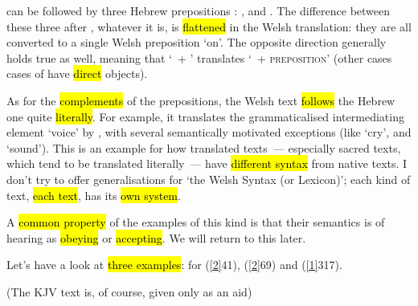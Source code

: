 \begin{paper}
	{\click} {\click} {\shama} can be followed by three Hebrew prepositions : ,  and . The difference between these three after \shama, whatever it is, is \hl{flattened} in the Welsh translation: they are all converted to a single Welsh preposition  ‘on’. The opposite direction generally holds true as well, meaning that ‘~+ ’ translates ‘\shama~+ \textsc{preposition}’ (other cases cases of  have \hl{direct} objects).

As for the \hl{complements} of the prepositions, the Welsh text \hl{follows} the Hebrew one quite \hl{literally}. For example, it translates the grammaticalised intermediating element  ‘voice’ by , with several semantically motivated exceptions (like  ‘cry’, and  ‘sound’). This is an example for how translated texts~— especially sacred texts, which tend to be translated literally~— have \hl{different syntax} from native texts. I don't try to offer generalisations for ‘the Welsh Syntax (or Lexicon)’; each kind of text, \hl{each text}, has its \hl{own system}.

A \hl{common property} of the examples of this kind  is that their semantics is of hearing as \hl{obeying} or \hl{accepting}. We will return to this later.

Let's have a look at \hl{three examples}: for   (\vref{2}{4}{1}{}),  (\vref{2}{6}{9}{}) and  (\vref{1}{3}{17}{}).

(The KJV text is, of course, given only as an aid)
\end{paper}

